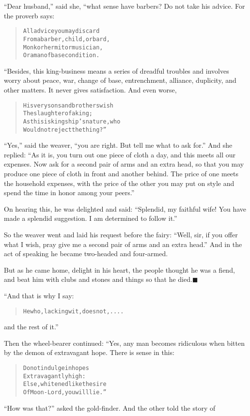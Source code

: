 \documentclass[article, twoside, 14pt]{memoir}
\newcommand{\qed}{\hfill \ensuremath{\blacksquare}}
\renewenvironment{verbatim}{%
\begin{quote}%
\vskip -10pt%
\begin{alltt}\normalfont\large}{\end{alltt}%
\end{quote}%
\vskip -10pt
} %
\begin{document}
``Dear husband,'' said she, “what sense have barbers? Do not take
his advice. For the proverb says:

\begin{verbatim}
All advice you may discard
From a barber, child, or bard,
Monk or hermit or musician,
Or a man of base condition.
\end{verbatim}
“Besides, this king-business means a series of dreadful
troubles and involves worry about peace, war, change of base,
entrenchment, alliance, duplicity, and other matters. It never
gives satisfaction. And even worse,

\begin{verbatim}
His very sons and brothers wish
    The slaughter of a king;
As this is kingship's nature, who
    Would not reject the thing?”
\end{verbatim}
``Yes,'' said the weaver,
``you are right. But tell me what to ask for.'' And she replied:
``As it is, you turn out one piece of cloth a day, and this meets all our expenses. Now ask for a second pair of arms and an extra head, so that you may produce one piece of cloth in front and another behind. The price of one meets the household expenses, with the price of the other you may put on style and spend the time in honor among your peers.''

On hearing this, he was delighted and said:
``Splendid, my faithful wife! You have made a splendid suggestion. I am determined to follow it.''

So the weaver went and laid his request before the fairy:
``Well, sir, if you offer what I wish, pray give me a second pair of arms and an extra head.''
And in the act of speaking he became two-headed and four-armed.

But as he came home, delight in his heart, the people thought he
was a fiend, and beat him with clubs and stones and things so that
he died.\hyperref[s85]{\qed}

“And that is why I say:

\begin{verbatim}
He who, lacking wit, does not,....
\end{verbatim}
and the rest of it.”

Then the wheel-bearer continued: “Yes, any man becomes ridiculous
when bitten by the demon of extravagant hope. There is sense in
this:

\begin{verbatim}
Do not indulge in hopes
    Extravagantly high:
Else, whitened like the sire
    Of Moon-Lord, you will lie.”
\end{verbatim}
``How was that?'' asked the gold-finder. And the other told the
story of
\end{document}
